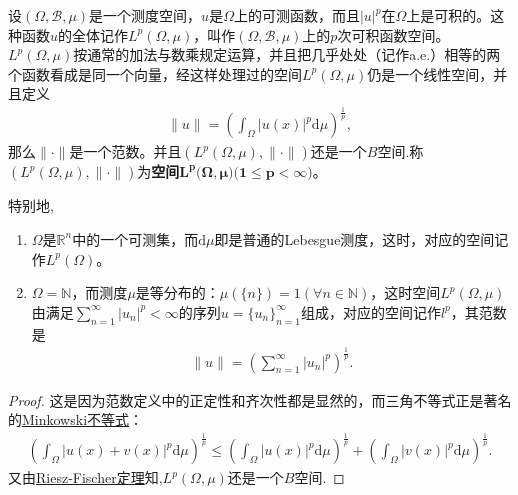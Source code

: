 \documentclass[../../main.tex]{subfiles}%
\begin{document}
\begin{proposition}\label{proposition:常见B空间11111}
设$(\Omega,\mathscr{B},\mu)$是一个测度空间，$u$是$\Omega$上的可测函数，而且$|u|^p$在$\Omega$上是可积的。这种函数$u$的全体记作$L^p(\Omega,\mu)$，叫作$(\Omega,\mathscr{B},\mu)$上的$p$次可积函数空间。$L^p(\Omega,\mu)$按通常的加法与数乘规定运算，并且把几乎处处（记作a.e.）相等的两个函数看成是同一个向量，经这样处理过的空间$L^p(\Omega,\mu)$仍是一个线性空间，并且定义
\begin{align*}
\|u\|=\left(\int_\Omega|u(x)|^p\mathrm{d}\mu\right)^{\frac{1}{p}},
\end{align*}
那么$\|\cdot\|$是一个范数。并且$(L^p(\Omega,\mu),\|\cdot\|)$还是一个$B$空间.称$(L^p(\Omega,\mu),\|\cdot\|)$为\textbf{空间}$\boldsymbol{L}^{\boldsymbol{p}}\boldsymbol{(\Omega },\boldsymbol{\mu }\mathbf{)(}\mathbf{1}\leqslant \boldsymbol{p}<\boldsymbol{\infty )}$。

特别地,
\begin{enumerate}[(1)]
\item $\Omega$是$\mathbb{R}^n$中的一个可测集，而$\mathrm{d}\mu$即是普通的Lebesgue测度，这时，对应的空间记作$L^p(\Omega)$。

\item $\Omega=\mathbb{N}$，而测度$\mu$是等分布的：$\mu(\{n\})=1(\forall n\in\mathbb{N})$，这时空间$L^p(\Omega,\mu)$由满足$\sum_{n=1}^\infty|u_n|^p<\infty$的序列$u=\{u_n\}_{n=1}^\infty$组成，对应的空间记作$l^p$，其范数是
\begin{align*}
\|u\|=\left(\sum_{n=1}^\infty|u_n|^p\right)^{\frac{1}{p}}.
\end{align*}
\end{enumerate}
\end{proposition}
\begin{proof}
这是因为范数定义中的正定性和齐次性都是显然的，而三角不等式正是著名的\hyperref[Real Analysis-theorem:实变函数--Minkowski不等式]{Minkowski不等式}：
\begin{align*}
\left(\int_\Omega|u(x)+v(x)|^p\mathrm{d}\mu\right)^{\frac{1}{p}}\leqslant\left(\int_\Omega|u(x)|^p\mathrm{d}\mu\right)^{\frac{1}{p}}+\left(\int_\Omega|v(x)|^p\mathrm{d}\mu\right)^{\frac{1}{p}}.
\end{align*}
又由\hyperref[Real Analysis-theorem:Riesz-Fischer定理的另一种常用形式]{Riesz-Fischer定理}知,$L^p(\Omega,\mu)$还是一个$B$空间.
\end{proof}
\end{document}

